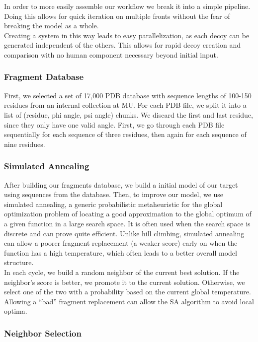 \documentclass{article}
\begin{document}
In order to more easily assemble our workflow we break it into a simple pipeline. Doing this allows for quick iteration on multiple fronts without the fear of breaking the model as a whole.\\

Creating a system in this way leads to easy parallelization, as each decoy can be generated independent of the others. This allows for rapid decoy creation and comparison with no human component necessary beyond initial input.


\subsubsection{Fragment Database}

First, we selected a set of 17,000 PDB database with sequence lengths of 100-150 residues from an internal collection at MU.  For each PDB file, we split it into a list of (residue, phi angle, psi angle) chunks.  We discard the first and last residue, since they only have one valid angle.  First, we go through each PDB file sequentially for each sequence of three residues, then again for each sequence of nine residues.


\subsubsection{Simulated Annealing}

After building our fragments database, we build a initial model of our target using sequences from the database. Then, to improve our model, we use simulated annealing, a generic probabilistic metaheuristic for the global optimization problem of locating a good approximation to the global optimum of a given function in a large search space. It is often used when the search space is discrete and can prove quite efficient. Unlike hill climbing, simulated annealing can allow a poorer fragment replacement (a weaker score) early on when the function has a high temperature, which often leads to a better overall model structure.\\

In each cycle, we build a random neighbor of the current best solution. If the neighbor’s score is better, we promote it to  the current solution. Otherwise, we select one of the two with a probability based on the current global temperature.  Allowing a “bad” fragment replacement can allow the SA algorithm to avoid local optima.


\subsubsection{Neighbor Selection}
\end{document}
